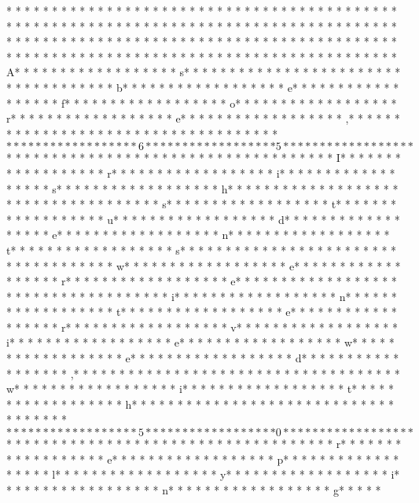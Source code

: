 * * *  * * *  * * *  *  * * *  *  * * *  * * *  * * *  *  * * *  *  * * *  * * *  * * *  *  * * *  *  * * *  *  * * *  * * *  * * *  *  * * *  *  * * *  *  * * *  * * *  * * *  *  * * *  *  * * *  *  * * *  * * *  * * *  *  * * *  *  * * *  *  * * *  * * *  * * *  *  * * *  *  * * *  *  * * *  * * *  * * *  *  * * *  *  * * *  *  * * *  * * *  * * *  *  * * *  *  * * *  *  * * *  * * *  * * *  *  * * *  *  * * *  * A* * *  * * *  * * *  *  * * *  *  * * *  * s* * *  * * *  * * *  *  * * *  *  * * *  *  * * *  * * *  * * *  *  * * *  *  * * *  * b* * *  * * *  * * *  *  * * *  *  * * *  * e* * *  * * *  * * *  *  * * *  *  * * *  * f* * *  * * *  * * *  *  * * *  *  * * *  * o* * *  * * *  * * *  *  * * *  *  * * *  * r* * *  * * *  * * *  *  * * *  *  * * *  * e* * *  * * *  * * *  *  * * *  *  * * *  * ,* * *  * * *  * * *  *  * * *  *  * * *  *  * * *  * * *  * * *  *  * * *  *  * * *  * $* * *  * * *  * * *  *  * * *  *  * * *  * 6* * *  * * *  * * *  *  * * *  *  * * *  * 5* * *  * * *  * * *  *  * * *  *  * * *  * $* * *  * * *  * * *  *  * * *  *  * * *  *  * * *  * * *  * * *  *  * * *  *  * * *  * I* * *  * * *  * * *  *  * * *  *  * * *  * r* * *  * * *  * * *  *  * * *  *  * * *  * i* * *  * * *  * * *  *  * * *  *  * * *  * s* * *  * * *  * * *  *  * * *  *  * * *  * h* * *  * * *  * * *  *  * * *  *  * * *  *  * * *  * * *  * * *  *  * * *  *  * * *  * s* * *  * * *  * * *  *  * * *  *  * * *  * t* * *  * * *  * * *  *  * * *  *  * * *  * u* * *  * * *  * * *  *  * * *  *  * * *  * d* * *  * * *  * * *  *  * * *  *  * * *  * e* * *  * * *  * * *  *  * * *  *  * * *  * n* * *  * * *  * * *  *  * * *  *  * * *  * t* * *  * * *  * * *  *  * * *  *  * * *  * s* * *  * * *  * * *  *  * * *  *  * * *  *  * * *  * * *  * * *  *  * * *  *  * * *  * w* * *  * * *  * * *  *  * * *  *  * * *  * e* * *  * * *  * * *  *  * * *  *  * * *  * r* * *  * * *  * * *  *  * * *  *  * * *  * e* * *  * * *  * * *  *  * * *  *  * * *  *  * * *  * * *  * * *  *  * * *  *  * * *  * i* * *  * * *  * * *  *  * * *  *  * * *  * n* * *  * * *  * * *  *  * * *  *  * * *  * t* * *  * * *  * * *  *  * * *  *  * * *  * e* * *  * * *  * * *  *  * * *  *  * * *  * r* * *  * * *  * * *  *  * * *  *  * * *  * v* * *  * * *  * * *  *  * * *  *  * * *  * i* * *  * * *  * * *  *  * * *  *  * * *  * e* * *  * * *  * * *  *  * * *  *  * * *  * w* * *  * * *  * * *  *  * * *  *  * * *  * e* * *  * * *  * * *  *  * * *  *  * * *  * d* * *  * * *  * * *  *  * * *  *  * * *  * ,* * *  * * *  * * *  *  * * *  *  * * *  *  * * *  * * *  * * *  *  * * *  *  * * *  * w* * *  * * *  * * *  *  * * *  *  * * *  * i* * *  * * *  * * *  *  * * *  *  * * *  * t* * *  * * *  * * *  *  * * *  *  * * *  * h* * *  * * *  * * *  *  * * *  *  * * *  *  * * *  * * *  * * *  *  * * *  *  * * *  * $* * *  * * *  * * *  *  * * *  *  * * *  * 5* * *  * * *  * * *  *  * * *  *  * * *  * 0* * *  * * *  * * *  *  * * *  *  * * *  * $* * *  * * *  * * *  *  * * *  *  * * *  *  * * *  * * *  * * *  *  * * *  *  * * *  * r* * *  * * *  * * *  *  * * *  *  * * *  * e* * *  * * *  * * *  *  * * *  *  * * *  * p* * *  * * *  * * *  *  * * *  *  * * *  * l* * *  * * *  * * *  *  * * *  *  * * *  * y* * *  * * *  * * *  *  * * *  *  * * *  * i* * *  * * *  * * *  *  * * *  *  * * *  * n* * *  * * *  * * *  *  * * *  *  * * *  * g* * *  * * 
